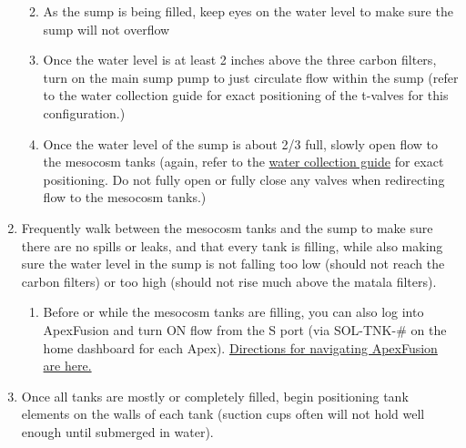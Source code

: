 \documentclass[
]{book}
\providecommand{\tightlist}{%
  \setlength{\itemsep}{0pt}\setlength{\parskip}{0pt}}
\begin{document}
\begin{enumerate}
  \begin{enumerate}
  \def\labelenumii{\arabic{enumii}.}
  \tightlist
  \item
    As the sump is being filled, keep eyes on the water level to make sure the sump will not overflow
  \item
    Once the water level is at least 2 inches above the three carbon filters, turn on the main sump pump to just circulate flow within the sump (refer to the water collection guide for exact positioning of the t-valves for this configuration.)
  \item
    Once the water level of the sump is about 2/3 full, slowly open flow to the mesocosm tanks (again, refer to the \href{06-water_collection.rmd}{water collection guide} for exact positioning. Do not fully open or fully close any valves when redirecting flow to the mesocosm tanks.)
  \end{enumerate}
\item
  Frequently walk between the mesocosm tanks and the sump to make sure there are no spills or leaks, and that every tank is filling, while also making sure the water level in the sump is not falling too low (should not reach the carbon filters) or too high (should not rise much above the matala filters).

  \begin{enumerate}
  \def\labelenumii{\arabic{enumii}.}
  \tightlist
  \item
    Before or while the mesocosm tanks are filling, you can also log into ApexFusion and turn ON flow from the S port (via SOL-TNK-\# on the home dashboard for each Apex). \href{12-apex_fusion_guide.rmd}{Directions for navigating ApexFusion are here.}
  \end{enumerate}
\item
  Once all tanks are mostly or completely filled, begin positioning tank elements on the walls of each tank (suction cups often will not hold well enough until submerged in water).


\end{enumerate}
\end{document}
